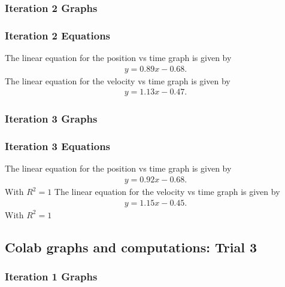 \documentclass{report}
\begin{document}
   \bigbreak \noindent 
    \subsubsection{Iteration 2 Graphs}
    \fc{}


    \bigbreak \noindent 
    \subsubsection{Iteration 2 Equations}
    \bigbreak \noindent 
        The linear equation for the position vs time graph is given by
    \begin{align*}
        y=0.89x-0.68
    .\end{align*}
    \bigbreak \noindent 
    The linear equation for the velocity vs time graph is given by
    \begin{align*}
        y=1.13x-0.47
    .\end{align*}


   \bigbreak \noindent 
    \subsubsection{Iteration 3 Graphs}
    \fc{}


   \bigbreak \noindent 
    \subsubsection{Iteration 3 Equations}
    The linear equation for the position vs time graph is given by
    \begin{align*}
        y=0.92x-0.68
    .\end{align*}
    With $R^{2} = 1$
    \bigbreak \noindent 
    The linear equation for the velocity vs time graph is given by
    \begin{align*}
        y=1.15x-0.45
    .\end{align*}
    With $R^{2} = 1$



    \bigbreak \noindent 
    \subsection{Colab graphs and computations: Trial 3}

    \bigbreak \noindent 
    \subsubsection{Iteration 1 Graphs}
    \fc{}
\end{document}
